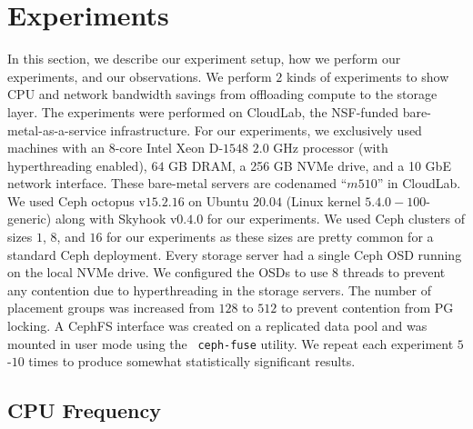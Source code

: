 \documentclass[11pt]{article}
\newcommand{\code}[1]{\colorbox{light-gray}{\texttt{#1}}}
\begin{document}
\section{Experiments}
\label{sec:experiments}
In this section, we describe our experiment setup, how we perform our experiments, and our observations. We perform $2$ kinds of experiments to show CPU and network bandwidth savings from offloading compute to the storage layer. The experiments were performed on CloudLab, the NSF-funded bare-metal-as-a-service infrastructure. For our
experiments, we exclusively used machines with an 8-core
Intel Xeon D-$1548$ $2.0$ GHz processor (with hyperthreading
enabled), $64$ GB DRAM, a 256 GB NVMe drive, and a 10 GbE
network interface. These bare-metal servers are codenamed
“$m510$” in CloudLab. We used Ceph octopus v$15.2.16$ on Ubuntu $20.04$ (Linux kernel $5.4.0-100$-generic) along with Skyhook v$0.4.0$ for our experiments. We used Ceph clusters of sizes $1$, $8$, and $16$ for our experiments as these sizes are pretty common for a standard Ceph deployment. Every storage server had a single Ceph OSD running on the local NVMe drive. We configured the OSDs to use $8$ threads to prevent any contention due to hyperthreading in the storage servers. The number of placement groups was increased from $128$ to $512$ to prevent contention from PG locking. A CephFS interface was created on a replicated data pool and was mounted in user mode using the ~\code{ceph-fuse} utility. We repeat each experiment $5$-$10$ times to produce somewhat statistically significant results. 
\subsection{CPU Frequency}
\end{document}
